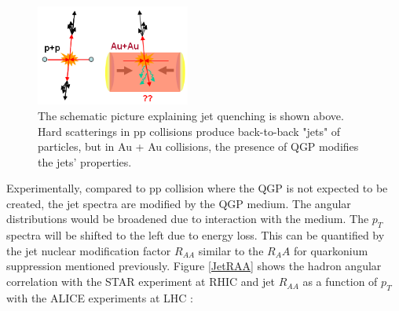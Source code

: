 \begin{figure}[hbtp]
\begin{center}
\includegraphics[width=0.45\textwidth]{Figures/Chapter1/JetELoss.png}
\caption{The schematic picture explaining jet quenching is shown above. Hard scatterings in pp collisions produce back-to-back "jets" of particles, but in Au + Au collisions, the presence of QGP modifies the jets' properties.}
\label{JetELoss}
\end{center}
\end{figure} 


Experimentally, compared to pp collision where the QGP is not expected to be created, the jet spectra are modified by the QGP medium. The angular distributions would be broadened due to interaction with the medium. The $p_T$ spectra will be shifted to the left due to energy loss. This can be quantified by the jet nuclear modification factor $R_{AA}$ similar to the $R_AA$ for quarkonium suppression mentioned previously. Figure \ref{JetRAA} shows the hadron angular correlation with the STAR experiment at RHIC and jet $R_{AA}$ as a function of $p_T$ with the ALICE experiments at LHC \cite{STARJetRef,ALICEJetRef}:
  
